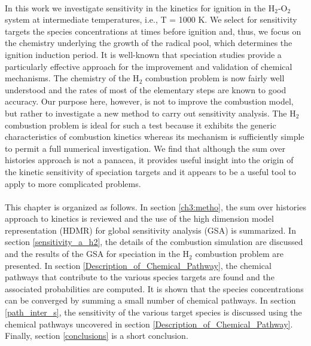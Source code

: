 \paragraph{}
In this work we investigate sensitivity in the kinetics for
ignition in the H$_2$-O$_2$ system at intermediate temperatures, i.e.,
T = 1000 K. We select for sensitivity targets the species
concentrations at times before ignition and, thus, we focus on
the chemistry underlying the growth of the radical pool, which
determines the ignition induction period. It is well-known that
speciation studies provide a particularly effective approach for
the improvement and validation of chemical mechanisms.\cite{ch3_18_karwat2011chemical}
The chemistry of the H$_2$ combustion problem is now fairly well
understood and the rates of most of the elementary steps are
known to good accuracy.\cite{ch3_19_konnov2008remaining,ch3_20_hashemi2015hydrogen} Our purpose here, however, is not
to improve the combustion model, but rather to investigate a
new method to carry out sensitivity analysis. The H$_2$ combustion problem is ideal for such a test because it exhibits
the generic characteristics of combustion kinetics whereas its
mechanism is sufficiently simple to permit a full numerical
investigation. We find that although the sum over histories
approach is not a panacea, it provides useful insight into the
origin of the kinetic sensitivity of speciation targets and it
appears to be a useful tool to apply to more complicated
problems.
\newline
\paragraph{}
This chapter is organized as follows. In section \ref{ch3:metho}, the sum over
histories approach to kinetics is reviewed and the use of the
high dimension model representation (HDMR) for global
sensitivity analysis (GSA) is summarized. In section \ref{sensitivity_a_h2}, the
details of the combustion simulation are discussed and the
results of the GSA for speciation in the H$_2$ combustion problem
are presented. In section \ref{Description_of_Chemical_Pathway}, the chemical pathways that
contribute to the various species targets are found and the
associated probabilities are computed. It is shown that the
species concentrations can be converged by summing a small
number of chemical pathways. In section \ref{path_inter_s}, the sensitivity of
the various target species is discussed using the chemical
pathways uncovered in section \ref{Description_of_Chemical_Pathway}. Finally, section \ref{conclusions} is a short
conclusion.
